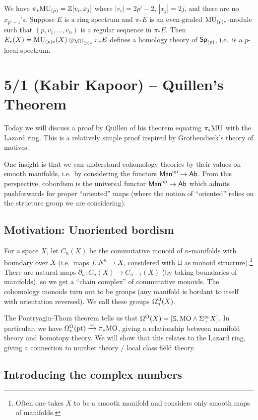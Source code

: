\documentclass{article}
\begin{document}
We have $\pi_* \mathrm{MU}_{(p)} = \mathbb{Z}[v_i, x_j]$ where $|v_i| = 2p^i - 2$, $|x_j| = 2j$, and there are no $x_{p^i - 1}$'s.
Suppose $E$ is a ring spectrum and $\pi_* E$ is an even-graded $\mathrm{MU}_{(p)*}$-module such that $(p, v_1, \dots, v_n)$ is a regular sequence in $\pi_* E$.
Then $E_*(X) = \mathrm{MU}_{(p)*}(X) \otimes_{\mathrm{MU}_{(p)*}} \pi_* E$ defines a homology theory of $\mathsf{Sp}_{(p)}$, i.e.\ is a $p$-local spectrum.

\section{5/1 (Kabir Kapoor) -- Quillen's Theorem}

Today we will discuss a proof by Quillen of his theorem equating $\pi_* \mathrm{MU}$ with the Lazard ring.
This is a relatively simple proof inspired by Grothendieck's theory of motives.

One insight is that we can understand cohomology theories by their values on smooth manifolds, i.e.\ by considering the functors $\mathsf{Man}^{\mathrm{op}} \to \mathsf{Ab}$.
From this perspective, cobordism is the universal functor $\mathsf{Man}^{\mathrm{op}} \to \mathsf{Ab}$ which admits pushforwards for proper ``oriented'' maps (where the notion of ``oriented'' relies on the structure group we are considering).

\subsection{Motivation: Unoriented bordism}

For a space $X$, let $C_n(X)$ be the commutative monoid of $n$-manifolds with boundary over $X$ (i.e.\ maps $f: N^n \to X$, considered with $\sqcup$ as monoid structure).\footnote{Often one takes $X$ to be a smooth manifold and considers only smooth maps of manifolds.}
There are natural maps $\partial_n: C_n(X) \to C_{n-1}(X)$ (by taking boundaries of manifolds), so we get a ``chain complex'' of commutative monoids.
The cohomology monoids turn out to be groups (any manifold is bordant to itself with orientation reversed).
We call these groups $\Omega^{\mathrm{O}}_n(X)$.

The Pontryagin-Thom theorem tells us that $\Omega^{\mathrm{O}}(X) = [\mathbb{S}, \mathrm{MO} \wedge \Sigma^\infty_+ X]$.
In particular, we have $\Omega^{\mathrm{O}}_*(\mathrm{pt}) \xrightarrow{\sim} \pi_* \mathrm{MO}$, giving a relationship between manifold theory and homotopy theory.
We will show that this relates to the Lazard ring, giving a connection to number theory / local class field theory.

\subsection{Introducing the complex numbers}
\end{document}
